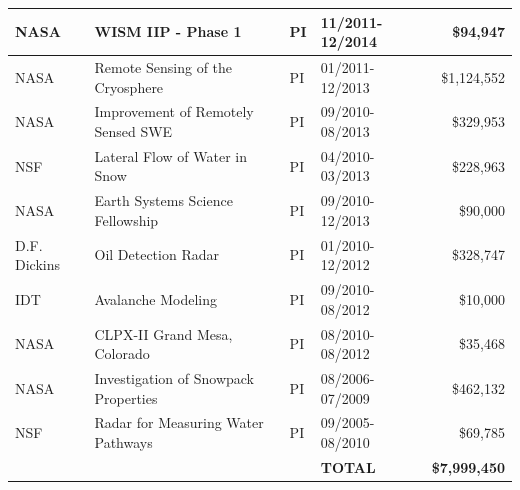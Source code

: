 \documentclass[11pt]{article}
\begin{document}
\begin{table}[!htbp]
\begin{tabular}{|l|l|l|l|r|}
NASA & WISM IIP - Phase 1 & PI & 11/2011-12/2014 & \$94,947 \\ \hline
NASA & Remote Sensing of the Cryosphere & PI & 01/2011-12/2013 & \$1,124,552 \\ \hline
NASA & Improvement of Remotely Sensed SWE & PI & 09/2010-08/2013 & \$329,953 \\ \hline
NSF & Lateral Flow of Water in Snow & PI & 04/2010-03/2013 & \$228,963 \\ \hline
NASA & Earth Systems Science Fellowship & PI & 09/2010-12/2013 & \$90,000 \\ \hline
D.F. Dickins & Oil Detection Radar & PI & 01/2010-12/2012 & \$328,747 \\ \hline
IDT & Avalanche Modeling & PI & 09/2010-08/2012 & \$10,000 \\ \hline
NASA & CLPX-II Grand Mesa, Colorado & PI & 08/2010-08/2012 & \$35,468 \\ \hline
NASA & Investigation of Snowpack Properties & PI & 08/2006-07/2009 & \$462,132 \\ \hline
NSF & Radar for Measuring Water Pathways & PI & 09/2005-08/2010 & \$69,785 \\ \hline
& &  & \textbf{TOTAL} & \textbf{\$7,999,450} \\ \hline
\end{tabular} %
\end{table}

\pagebreak
\end{document}
